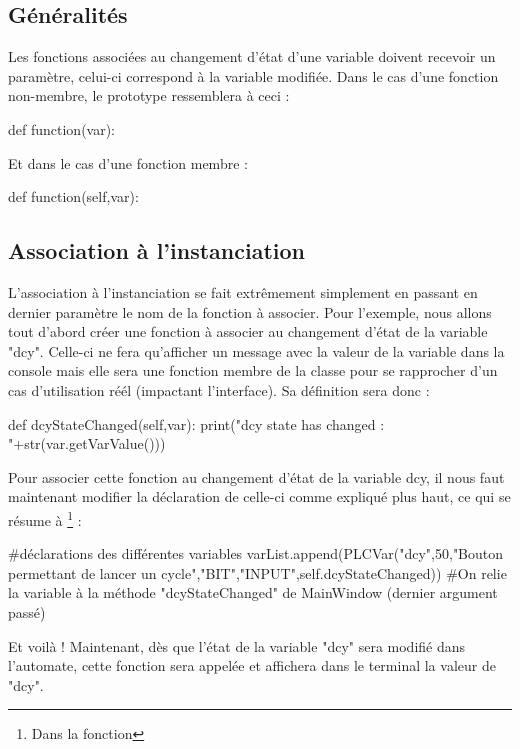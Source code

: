 \subsection{Généralités}

Les fonctions associées au changement d'état d'une variable doivent recevoir un paramètre, celui-ci correspond à la variable modifiée.
Dans le cas d'une fonction non-membre, le prototype ressemblera à ceci :
\begin{Python}
def function(var):
\end{Python}
Et dans le cas d'une fonction membre :
\begin{Python}
def function(self,var):
\end{Python}

\subsection{Association à l'instanciation}

L'association à l'instanciation se fait extrêmement simplement en passant en dernier paramètre le nom de la fonction à associer.\newline
Pour l'exemple, nous allons tout d'abord créer une fonction à associer au changement d'état de la variable "dcy". Celle-ci ne fera qu'afficher un message avec la valeur de la variable dans la console mais elle sera une fonction membre de la classe  pour se rapprocher d'un cas d'utilisation réél (impactant l'interface).\newline
Sa définition sera donc :
\begin{Python}
def dcyStateChanged(self,var):
		print("dcy state has changed : "+str(var.getVarValue()))
\end{Python}

Pour associer cette fonction au changement d'état de la variable dcy, il nous faut maintenant modifier la déclaration de celle-ci comme expliqué plus haut, ce qui se résume à \footnote{Dans la fonction } :
\begin{Python}
#déclarations des différentes variables
varList.append(PLCVar("dcy",50,"Bouton permettant de lancer un cycle","BIT","INPUT",self.dcyStateChanged))
#On relie la variable à la méthode "dcyStateChanged" de MainWindow (dernier argument passé)
\end{Python}
 Et voilà ! Maintenant, dès que l'état de la variable "dcy" sera modifié dans l'automate, cette fonction sera appelée et affichera dans le terminal la valeur de "dcy".
 
